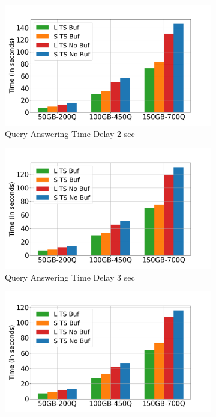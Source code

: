 \begin{figure}
	\centering
	\begin{subfigure}[c]{0.48\textwidth}
		\includegraphics[width=1\textwidth]   {figures/Experiments/Dynamic/xAxis/x_axis_delay[2].png}
		\caption{Query Answering Time Delay 2 sec}
		\label{fig:QA-xAxis-delay-2}
	\end{subfigure}
	\begin{subfigure}[c]{0.48\textwidth}
		\includegraphics[width=1\textwidth]   {figures/Experiments/Dynamic/xAxis/x_axis_delay[3].png}
		\caption{Query Answering Time Delay 3 sec}
		\label{fig:QA-xAxis-delay-3}
	\end{subfigure}
	\begin{subfigure}[c]{0.48\textwidth}
		\includegraphics[width=1\textwidth]   {figures/Experiments/Dynamic/xAxis/x_axis_delay[5].png}

\end{subfigure}
\end{figure}
